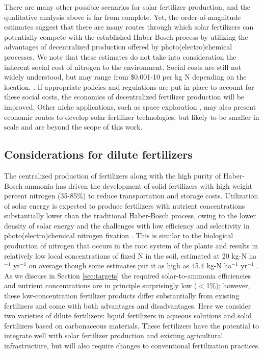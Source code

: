 There are many other possible scenarios for solar fertilizer production, and the qualitative analysis above is far from complete. Yet, the order-of-magnitude estimates suggest that there are many routes through which solar fertilizers can potentially compete with the established Haber-Bosch process by utilizing the advantages of decentralized production offered by photo(electro)chemical processes. We note that these estimates do not take into consideration the inherent social cost of nitrogen to the environment. Social costs are still not widely understood, but may range from \$0.001-10 per kg N depending on the location. \cite{keeler2016social}. If appropriate policies and regulations are put in place to account for these social costs, the economics of decentralized fertilizer production will be improved. Other niche applications, such as space exploration \cite{Meyer_2016}, may also present economic routes to develop solar fertilizer technologies, but likely to be smaller in scale and are beyond the scope of this work. 

\subsection{Considerations for dilute fertilizers}
\label{sec:dilute}

The centralized production of fertilizers along with the high purity of Haber-Bosch ammonia has driven the development of solid fertilizers with high weight percent nitrogen (35-85\%) to reduce transportation and storage costs. 
Utilization of solar energy is expected to produce fertilizers with nutrient concentrations substantially lower than the traditional Haber-Bosch process, owing to the lower density of solar energy \cite{MacKay_2013} and the challenges with low efficiency and selectivity in photo(electro)chemical nitrogen fixation \cite{Skulason_2012,Singh_2017}. This is similar to the biological production of nitrogen that occurs in the root system of the plants and results in relatively low local concentrations of fixed N in the soil, estimated at 20 kg-N ha$^{-1}$ yr$^{-1}$ on average \cite{Smil_1999_2,Unkovich_2009} though some estimates put it as high as 45.4 kg-N ha$^{-1}$ yr$^{-1}$ \cite{Herridge_2008}. As we discuss in Section \ref{sec:targets} the required solar-to-ammonia efficiencies and nutrient concentrations are in principle surprisingly low ($<$1\%); however, these low-concentration fertilizer products differ substantially from existing fertilizers and come with both advantages and disadvantages. Here we consider two varieties of dilute fertilizers: liquid fertilizers in aqueous solutions and solid fertilizers based on carbonaceous materials. These fertilizers have the potential to integrate well with solar fertilizer production and existing agricultural infrastructure, but will also require changes to conventional fertilization practices.

